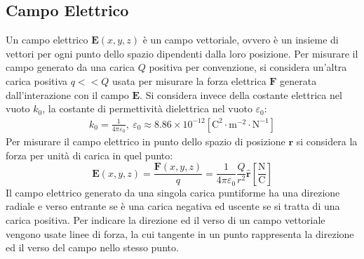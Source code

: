 \documentclass{article}
\newcommand{\vect}[1]{\boldsymbol{\mathbf{#1}}}
\newcommand{\SI}[1]{\mathrm{#1}}
\numberwithin{equation}{subsection}
\begin{document}
\subsection{Campo Elettrico}
Un campo elettrico $\vect{E}(x,y,z)$ è un campo vettoriale, ovvero è un insieme di vettori per ogni punto dello spazio dipendenti dalla loro posizione. Per misurare il campo 
generato da una carica $Q$ positiva per convenzione, si considera un'altra carica positiva $q<<Q$ usata per misurare la forza elettrica $\vect{F}$ generata dall'interazione con 
il campo $\vect{E}$. Si considera invece della costante elettrica nel vuoto $k_0$, la costante di permettività dielettrica nel vuoto $\varepsilon_0$:
\begin{gather}
    k_0=\displaystyle\frac{1}{4\pi\varepsilon_0},\:
    \varepsilon_0\approx8.86\times10^{-12}\left[\SI{C}^2\cdot\SI{m}^{-2}\cdot\SI{N}^{-1}\right]
\end{gather} 
Per misurare il campo elettrico in punto dello spazio di posizione $\vect{r}$ si considera la forza per unità di carica in quel punto:
\begin{equation}
    \vect{E}(x,y,z)=\displaystyle\frac{\vect{F}(x,y,z)}{q}=\frac{1}{4\pi\varepsilon_0}\frac{Q}{r^2}\hat{\vect{r}}\left[\frac{\SI{N}}{\SI{C}}\right]
\end{equation}
Il campo elettrico generato da una singola carica puntiforme ha una direzione radiale e verso entrante se è una carica negativa ed uscente se si tratta di una carica positiva. 
Per indicare la direzione ed il verso di un campo vettoriale vengono usate linee di forza, la cui tangente in un punto rappresenta la direzione ed il verso del campo nello 
stesso punto. 
\begin{figure}[H]%
    \centering
    \qquad
    \label{fig:campo-elettrico-cariche}
\end{figure}
\end{document}
